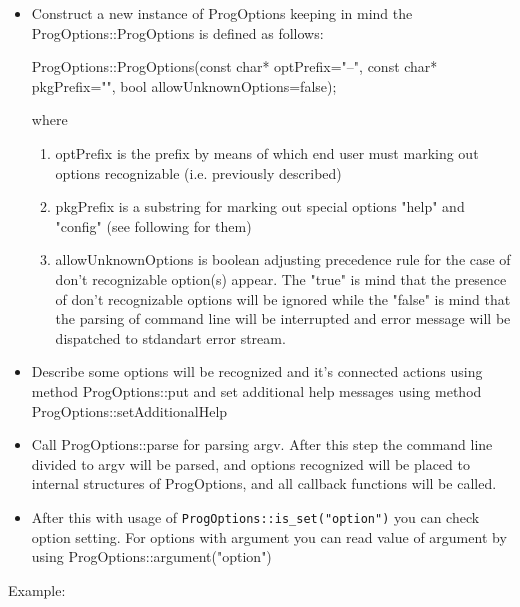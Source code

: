 \documentclass[10pt]{article}
\begin{document}
 \begin{itemize}
   \item Construct a new instance of ProgOptions keeping in mind the ProgOptions::ProgOptions
   	     is defined as follows:

         ProgOptions::ProgOptions(const char* optPrefix="--",
                                  const char* pkgPrefix="",
                                  bool allowUnknownOptions=false);

         where
   \begin{enumerate}
   \item optPrefix is the prefix by means of which end user must marking out options recognizable
         (i.e. previously described)
   \item pkgPrefix is a substring for marking out special options "help" and "config" 
         (see following for them)
   \item allowUnknownOptions is boolean adjusting precedence rule for the case of don't recognizable
         option(s) appear. The "true" is mind that the presence of don't recognizable options will
         be ignored while the "false" is mind that the parsing of command line will be interrupted
         and error message will be dispatched to stdandart error stream.
   \end{enumerate}

   \item Describe some options will be recognized and it's connected actions using method ProgOptions::put
         and set additional help messages using method ProgOptions::setAdditionalHelp

   \item Call ProgOptions::parse for parsing argv. After this step the command line divided to
         argv will be parsed, and options recognized will be placed to internal structures
         of ProgOptions, and all callback functions will be called.

   \item After this with usage of \verb|ProgOptions::is_set("option")| you can check option setting.
         For options with argument you can read value of argument by using 
         ProgOptions::argument("option")
 \end{itemize}

Example:
\end{document}
